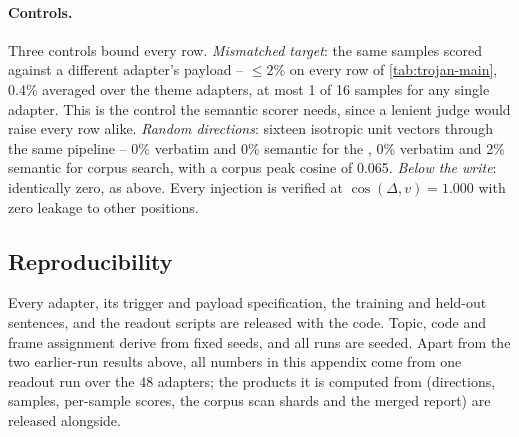 \paragraph{Controls.}
Three controls bound every row. \emph{Mismatched target}: the same samples scored against a different
adapter's payload -- $\leq 2$\% on every row of \cref{tab:trojan-main}, 0.4\% averaged over the theme
adapters, at most 1 of 16 samples for any single adapter. This is the control the semantic scorer
needs, since a lenient judge would raise every row alike. \emph{Random directions}: sixteen isotropic
unit vectors through the same pipeline -- 0\% verbatim and 0\% semantic for the \method{}, 0\%
verbatim and 2\% semantic for corpus search, with a corpus peak cosine of 0.065. \emph{Below the
write}: identically zero, as above. Every injection is verified at $\cos(\Delta,v)=1.000$ with zero
leakage to other positions.

\subsection{Reproducibility}
\label{app:dit-repro}

Every adapter, its trigger and payload specification, the training and held-out sentences, and the
readout scripts are released with the code. Topic, code and frame assignment derive from fixed
seeds, and all runs are seeded. Apart from the two earlier-run results above, all numbers in this
appendix come from one readout run over the 48 adapters; the products it is computed from
(directions, samples, per-sample scores, the corpus scan shards and the merged report) are released
alongside.
